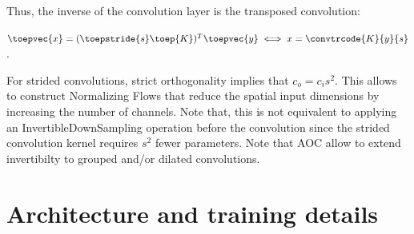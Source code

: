     
    Thus, the inverse of the convolution layer is the transposed convolution:
     
    $\toepvec{x} = (\toepstride{s} \toep{K})^T \toepvec{y} \iff x = \convtrcode{K}{y}{s}$.

   
    For strided convolutions, strict orthogonality implies that $c_o=c_is^2$. This allows to construct Normalizing Flows that reduce the spatial input dimensions by increasing  the number of channels. Note that, this is not equivalent to applying an InvertibleDownSampling operation before the convolution since the strided convolution kernel requires $s^2$ fewer parameters. Note that AOC allow to extend invertibilty to grouped and/or dilated convolutions.
    
    
\section{Architecture and training details}\label{sec:ap_training_details}

